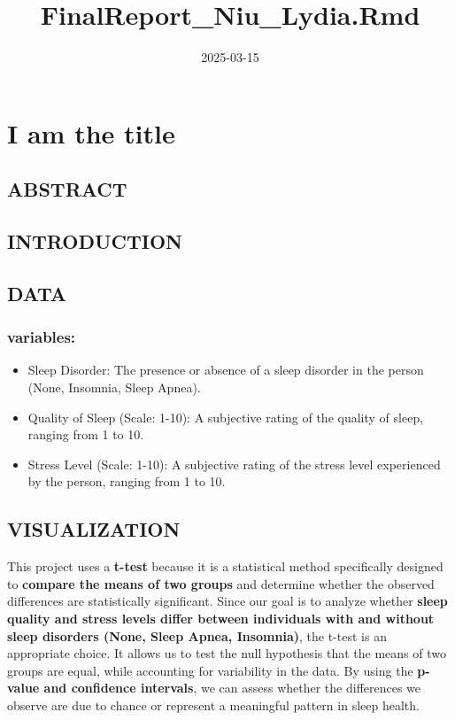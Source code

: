 \documentclass[
]{article}
\title{FinalReport\_Niu\_Lydia.Rmd}
\author{}
\date{\vspace{-2.5em}2025-03-15}
\providecommand{\tightlist}{%
  \setlength{\itemsep}{0pt}\setlength{\parskip}{0pt}}
\begin{document}
\maketitle

\section{I am the title}\label{i-am-the-title}

\subsection{ABSTRACT}\label{abstract}

\subsection{INTRODUCTION}\label{introduction}

\subsection{DATA}\label{data}

\subsubsection{variables:}\label{variables}

\begin{itemize}
\tightlist
\item
  Sleep Disorder: The presence or absence of a sleep disorder in the
  person (None, Insomnia, Sleep Apnea).
\item
  Quality of Sleep (Scale: 1-10): A subjective rating of the quality of
  sleep, ranging from 1 to 10.
\item
  Stress Level (Scale: 1-10): A subjective rating of the stress level
  experienced by the person, ranging from 1 to 10.
\end{itemize}

\subsection{VISUALIZATION}\label{visualization}

This project uses a \textbf{t-test} because it is a statistical method
specifically designed to \textbf{compare the means of two groups} and
determine whether the observed differences are statistically
significant. Since our goal is to analyze whether \textbf{sleep quality
and stress levels differ between individuals with and without sleep
disorders (None, Sleep Apnea, Insomnia)}, the t-test is an appropriate
choice. It allows us to test the null hypothesis that the means of two
groups are equal, while accounting for variability in the data. By using
the \textbf{p-value and confidence intervals}, we can assess whether the
differences we observe are due to chance or represent a meaningful
pattern in sleep health.
\end{document}
